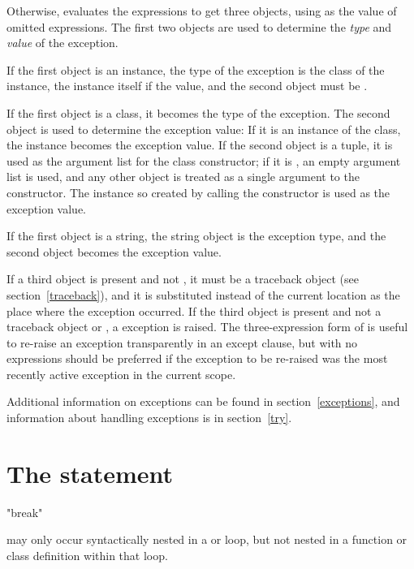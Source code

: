 Otherwise,  evaluates the expressions to get three
objects, using  as the value of omitted expressions.  The
first two objects are used to determine the \emph{type} and
\emph{value} of the exception.

If the first object is an instance, the type of the exception is the
class of the instance, the instance itself if the value, and the
second object must be .

If the first object is a class, it becomes the type of the exception.
The second object is used to determine the exception value: If it is
an instance of the class, the instance becomes the exception value.
If the second object is a tuple, it is used as the argument list for
the class constructor; if it is , an empty argument list is
used, and any other object is treated as a single argument to the
constructor.  The instance so created by calling the constructor is
used as the exception value.

If the first object is a string, the string object is the exception
type, and the second object becomes the exception value.

If a third object is present and not , it must be a
traceback object (see section~\ref{traceback}), and
it is substituted instead of the current location as the place where
the exception occurred.  If the third object is present and not a
traceback object or , a  exception is
raised.  The three-expression form of  is useful to
re-raise an exception transparently in an except clause, but
 with no expressions should be preferred if the
exception to be re-raised was the most recently active exception in
the current scope.

Additional information on exceptions can be found in
section~\ref{exceptions}, and information about handling exceptions is
in section~\ref{try}.


\section{The  statement \label{break}}

\begin{productionlist}
             {"break"}
\end{productionlist}

 may only occur syntactically nested in a 
or  loop, but not nested in a function or class definition
within that loop.

